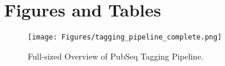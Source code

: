 
\chapter{Figures and Tables} %

\label{AppendixA} %


\begin{sidewaysfigure}[ht]
    \texttt{[image: Figures/tagging\_pipeline\_complete.png]}
    \caption[Overview of PubSeq Tagging Pipeline with all essential programs showed as nodes and important input/output files shown]{Full-sized Overview of PubSeq Tagging Pipeline.}
    \label{fig:PubSeqTaggingFull}
\end{sidewaysfigure}